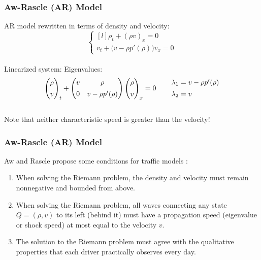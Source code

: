 \documentclass{beamer}
\begin{document}
\begin{frame}
\frametitle{Aw-Rascle (AR) Model}

AR model rewritten in terms of density and velocity: \\[1ex]

\[ \left\{ \begin{matrix*}[l] \rho_t + (\rho v)_x = 0 \\[2ex] v_t + \Big( v - \rho p'(\rho) \Big)v_x = 0 \end{matrix*} \right. \] \\[3ex]

\hspace{5em} Linearized system: \hspace{7em} Eigenvalues:
\[ \begin{pmatrix} \rho \\[1ex] v \end{pmatrix}_t + \begin{pmatrix} v & \rho \\[1ex] 0 & v - \rho p'(\rho)  \end{pmatrix} \begin{pmatrix} \rho \\[1ex] v \end{pmatrix}_x = 0 \hspace{5ex} \begin{matrix*}[l] \lambda_1 = v - \rho p'(\rho) \\[1ex] \lambda_2 = v \end{matrix*} \] \\[1ex]

Note that neither characteristic speed is greater than the velocity!

\end{frame}

\begin{frame}
\frametitle{Aw-Rascle (AR) Model}

Aw and Rascle propose some conditions for traffic models \cite{AwRascle2000}:
\begin{enumerate}
\item When solving the Riemann problem, the density and velocity must remain nonnegative and bounded from above.
\item When solving the Riemann problem, all waves connecting any state $Q = (\rho, v)$ to its left (behind it) must have a propagation speed (eigenvalue or shock speed) at most equal to the velocity $v$.  
\item The solution to the Riemann problem must agree with the qualitative properties that each driver practically observes every day.
\end{enumerate}

\end{frame}
\end{document}
